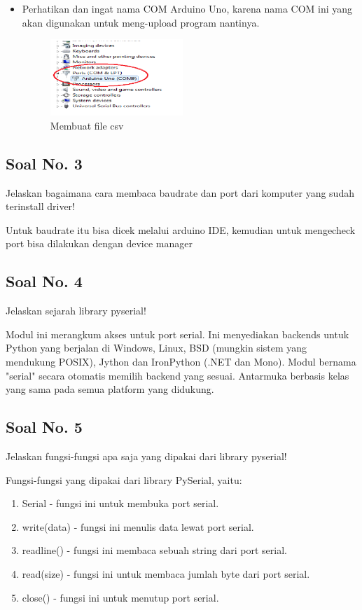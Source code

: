 \begin{enumerate}
\begin{itemize}
        \item Perhatikan dan ingat nama COM Arduino Uno, karena nama COM ini yang akan digunakan untuk meng-upload program nantinya.
        \begin{figure}[H]	
            \includegraphics[width=5cm]{figures/5/1174003/teori/10.png}
            \centering
            \caption{Membuat file csv}
        \end{figure}
        \end{itemize}
\end{enumerate}

\subsection{Soal No. 3}
Jelaskan bagaimana cara membaca baudrate dan port dari komputer yang sudah terinstall driver!

Untuk baudrate itu bisa dicek melalui arduino IDE, kemudian untuk mengecheck port bisa dilakukan dengan device manager

\subsection{Soal No. 4}
Jelaskan sejarah library pyserial!

Modul ini merangkum akses untuk port serial. Ini menyediakan backends untuk Python yang berjalan di Windows, Linux, BSD (mungkin sistem yang mendukung POSIX), Jython dan IronPython (.NET dan Mono). Modul bernama "serial" secara otomatis memilih backend yang sesuai. Antarmuka berbasis kelas yang sama pada semua platform yang didukung.

\subsection{Soal No. 5}
Jelaskan fungsi-fungsi apa saja yang dipakai dari library pyserial!

Fungsi-fungsi yang dipakai dari library PySerial, yaitu:
\begin{enumerate}
	\item Serial - fungsi ini untuk membuka port serial.
	\item write(data) - fungsi ini menulis data lewat port serial.
	\item readline() - fungsi ini membaca sebuah string dari port serial.
	\item read(size) - fungsi ini untuk membaca jumlah byte dari port serial.
	\item close() - fungsi ini untuk menutup port serial.
\end{enumerate}

